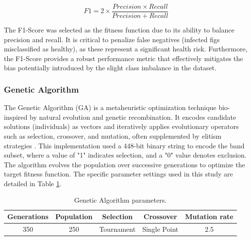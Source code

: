 \documentclass[ASNA,twocolumn]{USG}
\begin{document}
\begin{equation} \label{eq:f1_score}
    F1=2\times{\frac{Precision \times{Recall}}{Precision + Recall}}
\end{equation}


The F1-Score was selected as the fitness function due to its ability to balance precision and recall. 
It is critical to penalize false negatives (infected figs misclassified as healthy), as these represent a significant health risk. 
Furthermore, the F1-Score provides a robust performance metric that effectively mitigates the bias potentially introduced by the slight class imbalance in the dataset.

\subsubsection{Genetic Algorithm}
The Genetic Algorithm (GA) is a metaheuristic optimization technique bio-inspired by natural evolution and genetic recombination. 
It encodes candidate solutions (individuals) as vectors and iteratively applies evolutionary operators such as selection, crossover, and mutation, often supplemented by elitism strategies \cite{eiben_introduction_2015, deb_multi-objective_2001}. 
This implementation used a 448-bit binary string to encode the band subset, where a value of "1" indicates selection, and a "0" value denotes exclusion.
The algorithm evolves the population over successive generations to optimize the target fitness function. 
The specific parameter settings used in this study are detailed in Table \ref{tab1}.

\begin{table}[!ht]
    \caption{Genetic Algorithm parameters.\label{tab1}}
    \centering
    \small %
    \setlength{\tabcolsep}{3pt} %
    \begin{tabular}{ccccc}
        \toprule
        \textbf{Generations} & \textbf{Population} & \textbf{Selection} & \textbf{Crossover} & \textbf{Mutation rate}\\
        \midrule
        350 & 250 & Tournament & Single Point & 2.5\\
        \bottomrule
    \end{tabular}
\end{table}
\end{document}
